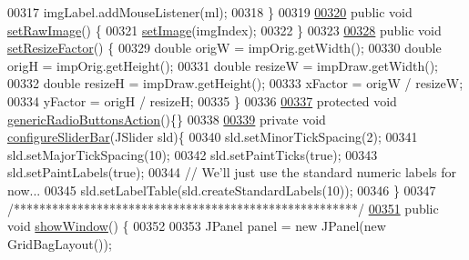 \begin{DoxyCode}
{00317     imgLabel.addMouseListener(ml);
00318   \}
00319 
\hypertarget{_image_analysis_window_8java_source_l00320}{}\hyperlink{classgui_1_1_image_analysis_window_a612d8bbeb78a27050cf59d9db734fc11}{00320}   \textcolor{keyword}{public} \textcolor{keywordtype}{void} \hyperlink{classgui_1_1_image_analysis_window_a612d8bbeb78a27050cf59d9db734fc11}{setRawImage}() \{
00321     \hyperlink{classgui_1_1_image_analysis_window_a3e14b1197961eed6fd530110e15380ec}{setImage}(imgIndex);
00322   \}
00323 
\hypertarget{_image_analysis_window_8java_source_l00328}{}\hyperlink{classgui_1_1_image_analysis_window_aa8880ccb12f2638822de16dd50e9c6d1}{00328}   \textcolor{keyword}{public} \textcolor{keywordtype}{void} \hyperlink{classgui_1_1_image_analysis_window_aa8880ccb12f2638822de16dd50e9c6d1}{setResizeFactor}() \{
00329     \textcolor{keywordtype}{double} origW = impOrig.getWidth();
00330     \textcolor{keywordtype}{double} origH = impOrig.getHeight();
00331     \textcolor{keywordtype}{double} resizeW = impDraw.getWidth();
00332     \textcolor{keywordtype}{double} resizeH = impDraw.getHeight();
00333     xFactor = origW / resizeW;
00334     yFactor = origH / resizeH;
00335   \}
00336 
\hypertarget{_image_analysis_window_8java_source_l00337}{}\hyperlink{classgui_1_1_image_analysis_window_ac6d8295d31ef4fe8406770e84eb35bf6}{00337}   \textcolor{keyword}{protected} \textcolor{keywordtype}{void} \hyperlink{classgui_1_1_image_analysis_window_ac6d8295d31ef4fe8406770e84eb35bf6}{genericRadioButtonsAction}()\{\}
00338   
\hypertarget{_image_analysis_window_8java_source_l00339}{}\hyperlink{classgui_1_1_image_analysis_window_a59aed828ede257a7487f529a114dbf3d}{00339}   \textcolor{keyword}{private} \textcolor{keywordtype}{void} \hyperlink{classgui_1_1_image_analysis_window_a59aed828ede257a7487f529a114dbf3d}{configureSliderBar}(JSlider sld)\{
00340     sld.setMinorTickSpacing(2);
00341     sld.setMajorTickSpacing(10);
00342     sld.setPaintTicks(\textcolor{keyword}{true});
00343     sld.setPaintLabels(\textcolor{keyword}{true});
00344     \textcolor{comment}{// We'll just use the standard numeric labels for now...}
00345     sld.setLabelTable(sld.createStandardLabels(10));
00346   \}
00347   \textcolor{comment}{/******************************************************/}
\hypertarget{_image_analysis_window_8java_source_l00351}{}\hyperlink{classgui_1_1_image_analysis_window_aae02cc4cef6bcbb0d78251146784b058}{00351}   \textcolor{keyword}{public} \textcolor{keywordtype}{void} \hyperlink{classgui_1_1_image_analysis_window_aae02cc4cef6bcbb0d78251146784b058}{showWindow}() \{
00352 
00353     JPanel panel = \textcolor{keyword}{new} JPanel(\textcolor{keyword}{new} GridBagLayout());
}
\end{DoxyCode}

